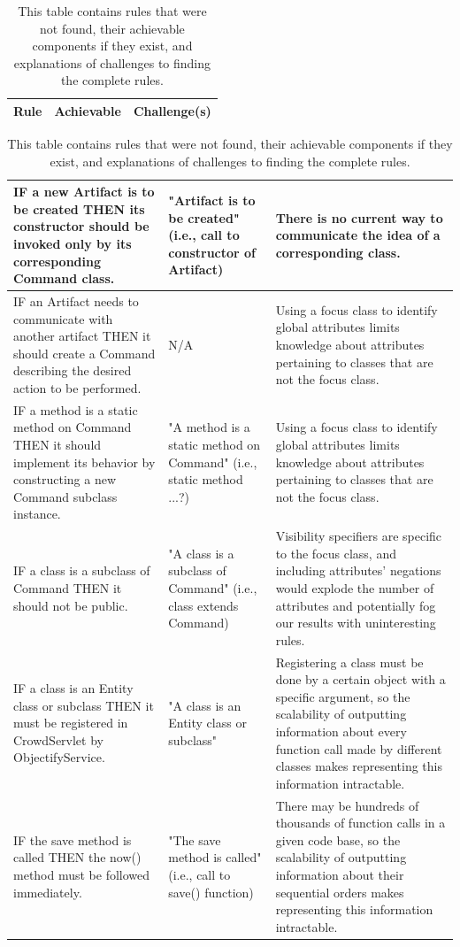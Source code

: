 \documentclass[12pt]{article}
\begin{document}
\begin{table}[H]
\centering
\begin{tabular}{| >{\centering\arraybackslash}m{5.5cm} | >{\centering\arraybackslash}m{4.5cm} | >{\centering\arraybackslash}m{5.5cm} |}
\hline
Rule & Achievable & Challenge(s) \\ \hline
\end{tabular}

\begin{tabular}{| >{\arraybackslash}m{5.5cm} | >{\arraybackslash}m{4.5cm} | >{\arraybackslash}m{5.5cm} |}
IF a new Artifact is to be created THEN its constructor should be invoked only by its corresponding Command class. & "Artifact is to be created" (i.e., call to constructor of Artifact) & There is no current way to communicate the idea of a corresponding class. \\ \hline
IF an Artifact needs to communicate with another artifact THEN it should create a Command describing the desired action to be performed. & N/A & Using a focus class to identify global attributes limits knowledge about attributes pertaining to classes that are not the focus class. \\ \hline
IF a method is a static method on Command THEN it should implement its behavior by constructing a new Command subclass instance. & "A method is a static method on Command" (i.e., static method ...?) & Using a focus class to identify global attributes limits knowledge about attributes pertaining to classes that are not the focus class. \\ \hline
IF a class is a subclass of Command THEN it should not be public. & "A class is a subclass of Command" (i.e., class extends Command) & Visibility specifiers are specific to the focus class, and including attributes' negations would explode the number of attributes and potentially fog our results with uninteresting rules. \\ \hline
IF a class is an Entity class or subclass THEN it must be registered in CrowdServlet by ObjectifyService. & "A class is an Entity class or subclass" & Registering a class must be done by a certain object with a specific argument, so the scalability of outputting information about every function call made by different classes makes representing this information intractable. \\ \hline
IF the save method is called THEN the now() method must be followed immediately. & "The save method is called" (i.e., call to save() function) & There may be hundreds of thousands of function calls in a given code base, so the scalability of outputting information about their sequential orders makes representing this information intractable. \\ \hline
\end{tabular}

\caption{This table contains rules that were not found, their achievable components if they exist, and explanations of challenges to finding the complete rules.}
\end{table}		
\end{document}
